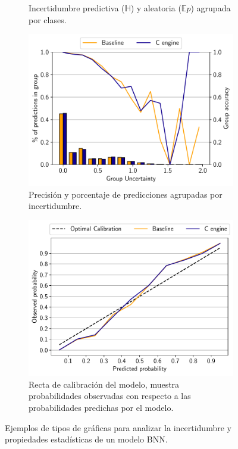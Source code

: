 \begin{figure}[h]
\begin{subfigure}[b]{0.48\textwidth}
         \caption{Incertidumbre predictiva ($\mathbb{H}$) y aleatoria ($\mathbb{E}p$) agrupada por clases.\\}
         \label{fig:example_class}
     \end{subfigure}
     \hfill
     \begin{subfigure}[b]{0.48\textwidth}
         \centering
         \includegraphics[width=\textwidth]{root/Imagenes/4_bnn_riscv/acc_vs_unc.pdf}
         \caption{Precisión y porcentaje de predicciones agrupadas por incertidumbre.\\}
         \label{fig:example_acc_unc}
     \end{subfigure}
     \hfill
     \begin{subfigure}[b]{0.48\textwidth}
         \centering
         \includegraphics[width=\textwidth]{root/Imagenes/4_bnn_riscv/calibration.pdf}
         \caption{Recta de calibración del modelo, muestra probabilidades observadas con respecto a las probabilidades predichas por el modelo.}
         \label{fig:example_calibration}
     \end{subfigure}
        \caption{Ejemplos de tipos de gráficas para analizar la incertidumbre y propiedades estadísticas de un modelo BNN.}
        \label{fig:figure_example}
\end{figure}

